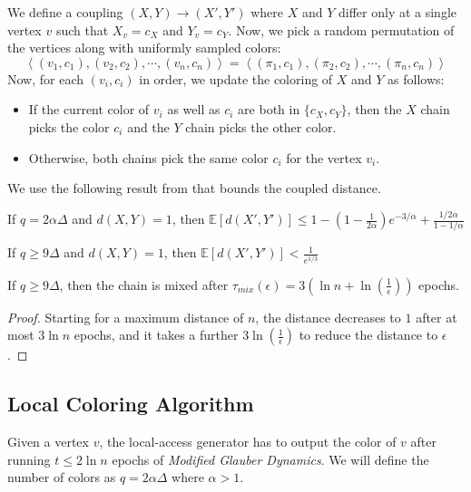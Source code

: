 We define a coupling $(X,Y)\rightarrow(X',Y')$ where $X$ and $Y$ differ only at a single vertex $v$ such that $X_v = c_X$ and $Y_v = c_Y$.
Now, we pick a random permutation of the vertices along with uniformly sampled colors:
\[
\left\langle (v_1, c_1), (v_2, c_2), \cdots, (v_n, c_n)\right\rangle
= \left\langle (\pi_1, c_1), (\pi_2, c_2), \cdots, (\pi_n, c_n)\right\rangle
\]
Now, for each $(v_i, c_i)$ in order, we update the coloring of $X$ and $Y$ as follows:
\begin{itemize}
    \item If the current color of $v_i$ as well as $c_i$ are both in $\{c_X,c_Y\}$,
    then the $X$ chain picks the color $c_i$ and the $Y$ chain picks the other color.
    \item Otherwise, both chains pick the same color $c_i$ for the vertex $v_i$.
\end{itemize}
We use the following result from \cite{mohsen} that bounds the coupled distance.
\begin{lemma}
\label{lem:mohsen_single_epoch_distance}
If $q = 2\alpha\Delta$ and $d(X, Y) = 1$, then $\mathbb E[d(X',Y')] \le 1-\left( 1-\frac1{2\alpha}\right)e^{-3/\alpha} + \frac{1/2\alpha}{1-1/\alpha}$
\end{lemma}
\begin{corollary}
\label{cor:single_epoch_distansce}
If $q \ge 9\Delta$ and $d(X, Y) = 1$, then $\mathbb E[d(X',Y')] < \frac1{e^{1/3}}$
\end{corollary}

\begin{theorem}
\label{thm:modified_mixing_time}
If $q\ge 9\Delta$, then the chain is mixed after $\tau_{mix}(\epsilon) = 3\left( \ln n + \ln(\frac1{\epsilon})\right)$ epochs.
\end{theorem}
\begin{proof}
Starting for a maximum distance of $n$, the distance decreases to $1$ after at most $3\ln n$ epochs,
and it takes a further $3\ln\left( \frac{1}{\epsilon} \right)$ to reduce the distance to $\epsilon$.
\end{proof}




\subsection{Local Coloring Algorithm}%
\label{sub:local_coloring_algortihm}
Given a vertex $v$, the local-access generator has to output the color of $v$ after running $t \le 2\ln n$ epochs of \emph{Modified Glauber Dynamics}.
We will define the number of colors as $q = 2\alpha\Delta$ where $\alpha > 1$.

